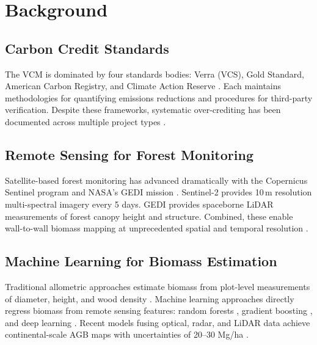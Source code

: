 \section{Background}

\label{sec:background}

\subsection{Carbon Credit Standards}

The VCM is dominated by four standards bodies: Verra (VCS), Gold
Standard, American Carbon Registry, and Climate Action Reserve
\citep{schneider2019double}. Each maintains methodologies for
quantifying emissions reductions and procedures for third-party
verification. Despite these frameworks, systematic over-crediting has
been documented across multiple project types \citep{badgley2022,
west2023action}.

\subsection{Remote Sensing for Forest Monitoring}

Satellite-based forest monitoring has advanced dramatically with the
Copernicus Sentinel program \citep{drusch2012sentinel} and NASA's
GEDI mission \citep{dubayah2020global}. Sentinel-2 provides 10\,m
resolution multi-spectral imagery every 5 days. GEDI provides
spaceborne LiDAR measurements of forest canopy height and structure.
Combined, these enable wall-to-wall biomass mapping at unprecedented
spatial and temporal resolution \citep{lang2023high}.

\subsection{Machine Learning for Biomass Estimation}

Traditional allometric approaches estimate biomass from plot-level
measurements of diameter, height, and wood density \citep{chave2014improved}.
Machine learning approaches directly regress biomass from remote sensing
features: random forests \citep{rodriguez2021predicting}, gradient
boosting \citep{hancock2019gradient}, and deep learning
\citep{lang2023high}. Recent models fusing optical, radar, and LiDAR
data achieve continental-scale AGB maps with uncertainties of 20--30
Mg/ha \citep{xu2021changes}.

